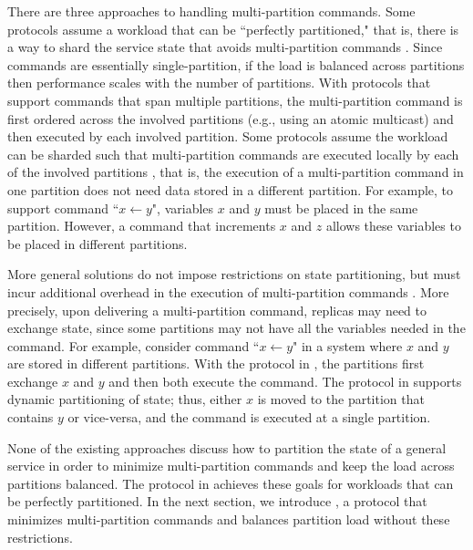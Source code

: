 There are three approaches to handling multi-partition commands.
Some protocols assume a workload that can be ``perfectly partitioned," that is, there is a way to shard the service state that avoids multi-partition commands \cite{hoang2016,Nogueira17}.
Since commands are essentially single-partition, if the load is balanced across partitions then performance scales with the number of partitions.
With protocols that support commands that span multiple partitions, the multi-partition command is first ordered across the involved partitions (e.g., using an atomic multicast) and then executed by each involved partition.
Some protocols assume the workload can be sharded such that multi-partition commands are executed locally by each of the involved partitions \cite{Mu2016}, that is, the execution of a multi-partition command in one partition does not need data stored in a different partition.
For example, to support command ``$x \leftarrow y$", variables $x$ and $y$ must be placed in the same partition.
However, a command that increments $x$ and $z$ allows these variables to be placed in different partitions.

More general solutions do not impose restrictions on state partitioning, but must incur additional overhead in the execution of multi-partition commands \cite{bezerra2014ssmr, hoang2016}.
More precisely, upon delivering a multi-partition command, replicas may need to exchange state, since some partitions may not have all the variables needed in the command.
For example, consider command ``$x \leftarrow y$" in a system where $x$ and $y$ are stored in different partitions.
With the protocol in \cite{bezerra2014ssmr}, the partitions first exchange $x$ and $y$ and then both execute the command.
The protocol in \cite{hoang2016} supports dynamic partitioning of state; thus, either $x$ is moved to the partition that contains $y$ or vice-versa, and the command is executed at a single partition.

None of the existing approaches discuss how to partition the state of a general service in order to minimize multi-partition commands and keep the load across partitions balanced.
The protocol in \cite{hoang2016} achieves these goals for workloads that can be perfectly partitioned.
In the next section, we introduce \dynastar, a protocol that minimizes multi-partition commands and balances partition load without these restrictions. 

